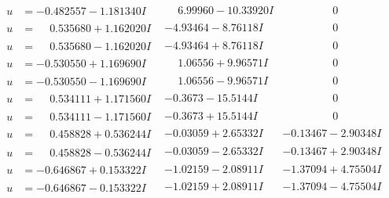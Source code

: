 \documentclass[1p]{elsarticle_modified}
\theoremstyle{definition}
\begin{document}
$$\begin{array}{c|c|c}
\begin{aligned}
u &= -0.482557 - 1.181340 I\end{aligned}
 & \phantom{-}6.99960 - 10.33920 I & \phantom{-0.000000 } 0 \\ \hline\begin{aligned}
u &= \phantom{-}0.535680 + 1.162020 I\end{aligned}
 & -4.93464 - 8.76118 I & \phantom{-0.000000 } 0 \\ \hline\begin{aligned}
u &= \phantom{-}0.535680 - 1.162020 I\end{aligned}
 & -4.93464 + 8.76118 I & \phantom{-0.000000 } 0 \\ \hline\begin{aligned}
u &= -0.530550 + 1.169690 I\end{aligned}
 & \phantom{-}1.06556 + 9.96571 I & \phantom{-0.000000 } 0 \\ \hline\begin{aligned}
u &= -0.530550 - 1.169690 I\end{aligned}
 & \phantom{-}1.06556 - 9.96571 I & \phantom{-0.000000 } 0 \\ \hline\begin{aligned}
u &= \phantom{-}0.534111 + 1.171560 I\end{aligned}
 & -0.3673 - 15.5144 I & \phantom{-0.000000 } 0 \\ \hline\begin{aligned}
u &= \phantom{-}0.534111 - 1.171560 I\end{aligned}
 & -0.3673 + 15.5144 I & \phantom{-0.000000 } 0 \\ \hline\begin{aligned}
u &= \phantom{-}0.458828 + 0.536244 I\end{aligned}
 & -0.03059 + 2.65332 I & -0.13467 - 2.90348 I \\ \hline\begin{aligned}
u &= \phantom{-}0.458828 - 0.536244 I\end{aligned}
 & -0.03059 - 2.65332 I & -0.13467 + 2.90348 I \\ \hline\begin{aligned}
u &= -0.646867 + 0.153322 I\end{aligned}
 & -1.02159 - 2.08911 I & -1.37094 + 4.75504 I \\ \hline\begin{aligned}
u &= -0.646867 - 0.153322 I\end{aligned}
 & -1.02159 + 2.08911 I & -1.37094 - 4.75504 I \\ \hline\begin{aligned}

\end{aligned}
\end{array}$$
\end{document}
